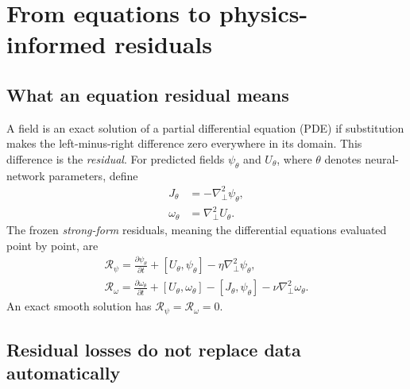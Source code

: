 \documentclass[11pt]{article}
\newcommand{\bracket}[2]{\left[#1,#2\right]}
\newcommand{\Rpsi}{\mathcal{R}_{\psi}}
\newcommand{\Romega}{\mathcal{R}_{\omega}}
\newcommand{\Lap}{\nabla_{\!\perp}^{2}}
\begin{document}
\section{From equations to physics-informed residuals}
\label{sec:pinnresiduals}

\subsection{What an equation residual means}

A field is an exact solution of a partial differential equation (PDE) if substitution makes the left-minus-right difference zero everywhere in its domain. This difference is the \emph{residual}. For predicted fields $\psi_\theta$ and $U_\theta$, where $\theta$ denotes neural-network parameters, define
\begin{align}
J_\theta&=-\Lap\psi_\theta,\\
\omega_\theta&=\Lap U_\theta.
\end{align}
The frozen \emph{strong-form} residuals, meaning the differential equations evaluated point by point, are
\begin{align}
\boxed{
\Rpsi
=\frac{\partial\psi_\theta}{\partial t}
+\bracket{U_\theta}{\psi_\theta}
-\eta\Lap\psi_\theta,}
\label{eq:Rpsi}\\[0.4em]
\boxed{
\Romega
=\frac{\partial\omega_\theta}{\partial t}
+\bracket{U_\theta}{\omega_\theta}
-\bracket{J_\theta}{\psi_\theta}
-\nu\Lap\omega_\theta.}
\label{eq:Romega}
\end{align}
An exact smooth solution has $\Rpsi=\Romega=0$.

\subsection{Residual losses do not replace data automatically}
\end{document}
